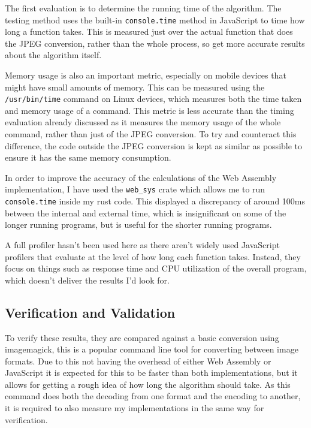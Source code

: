 \documentclass[12pt,a4paper]{article}
\begin{document}
The first evaluation is to determine the running time of the algorithm. The testing method uses the built-in \texttt{console.time} method in JavaScript to time how long a function takes. This is measured just over the actual function that does the JPEG conversion, rather than the whole process, so get more accurate results about the algorithm itself.

Memory usage is also an important metric, especially on mobile devices that might have small amounts of memory. This can be measured using the \texttt{/usr/bin/time} command on Linux devices, which measures both the time taken and memory usage of a command. This metric is less accurate than the timing evaluation already discussed as it measures the memory usage of the whole command, rather than just of the JPEG conversion. To try and counteract this difference, the code outside the JPEG conversion is kept as similar as possible to ensure it has the same memory consumption.

In order to improve the accuracy of the calculations of the Web Assembly implementation, I have used the \texttt{web\_sys} crate which allows me to run \texttt{console.time} inside my rust code. This displayed a discrepancy of around 100ms between the internal and external time, which is insignificant on some of the longer running programs, but is useful for the shorter running programs.

A full profiler hasn't been used here as there aren't widely used JavaScript profilers that evaluate at the level of how long each function takes. Instead, they focus on things such as response time and CPU utilization of the overall program, which doesn't deliver the results I'd look for.

\subsection{Verification and Validation}

To verify these results, they are compared against a basic conversion using imagemagick, this is a popular command line tool for converting between image formats. Due to this not having the overhead of either Web Assembly or JavaScript it is expected for this to be faster than both implementations, but it allows for getting a rough idea of how long the algorithm should take. As this command does both the decoding from one format and the encoding to another, it is required to also measure my implementations in the same way for verification.
\end{document}
